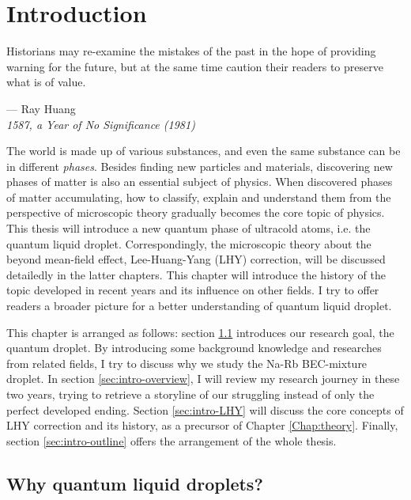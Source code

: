 \chapter{Introduction}
\label{Chap:intro}

\setlength{\unitlength}{1pt}
\setlength{\epigraphwidth}{11cm}
\epigraph{Historians may re-examine the mistakes of the past in the hope of providing warning for the future, but at the same time caution their readers to preserve what is of value. \cite{HuangRay19811ayo}}{--- Ray Huang\\ \textit{1587, a Year of No Significance (1981)}}

The world is made up of various substances, and even the same substance can be in different \textit{phases}. Besides finding new particles and materials, discovering new phases of matter is also an essential subject of physics. When discovered phases of matter accumulating, how to classify, explain and understand them from the perspective of microscopic theory gradually becomes the core topic of physics. This thesis will introduce a new quantum phase of ultracold atoms, i.e. the quantum liquid droplet. Correspondingly, the microscopic theory about the beyond mean-field effect, Lee-Huang-Yang (LHY) correction\cite{lee1957}, will be discussed detailedly in the latter chapters. This chapter will introduce the history of the topic developed in recent years and its influence on other fields. I try to offer readers a broader picture for a better understanding of quantum liquid droplet.

This chapter is arranged as follows: section \ref{sec:intro-background} introduces our research goal, the quantum droplet. By introducing some background knowledge and researches from related fields, I try to discuss why we study the Na-Rb BEC-mixture droplet. In section \ref{sec:intro-overview}, I will review my research journey in these two years, trying to retrieve a storyline of our struggling instead of only the perfect developed ending. Section \ref{sec:intro-LHY} will discuss the core concepts of LHY correction and its history, as a precursor of Chapter \ref{Chap:theory}. Finally, section \ref{sec:intro-outline} offers the arrangement of the whole thesis.

\section{Why quantum liquid droplets?}
\label{sec:intro-background}

